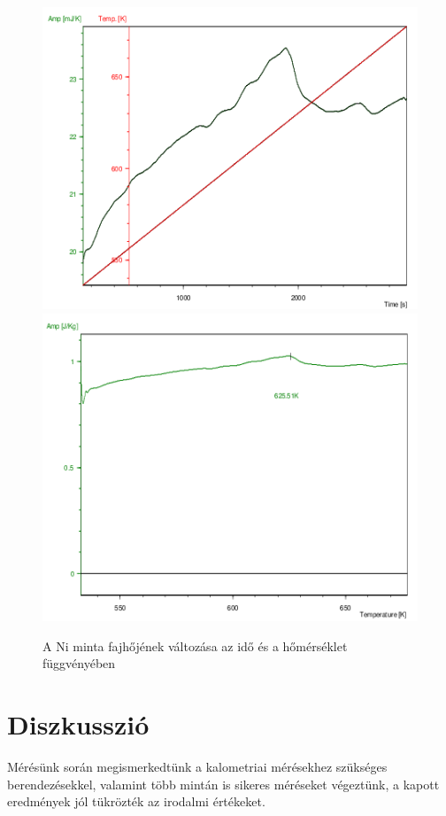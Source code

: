 \documentclass[12pt,a4paper]{article}
\begin{document}
\begin{figure}[!h]
\hspace*{-20pt}
  \includegraphics[width=\linewidth]{14fin}
\endminipage
\hspace*{10pt}
  \includegraphics[width=\linewidth]{15fin}
\endminipage
\caption{A Ni minta fajhőjének változása az idő és a hőmérséklet függvényében}
\label{fig:fajho}
\end{figure}

\section{Diszkusszió}
\hspace*{10pt} Mérésünk során megismerkedtünk a kalometriai mérésekhez szükséges berendezésekkel, valamint több mintán is sikeres méréseket végeztünk, a kapott eredmények jól tükrözték az irodalmi értékeket.
\end{document}
